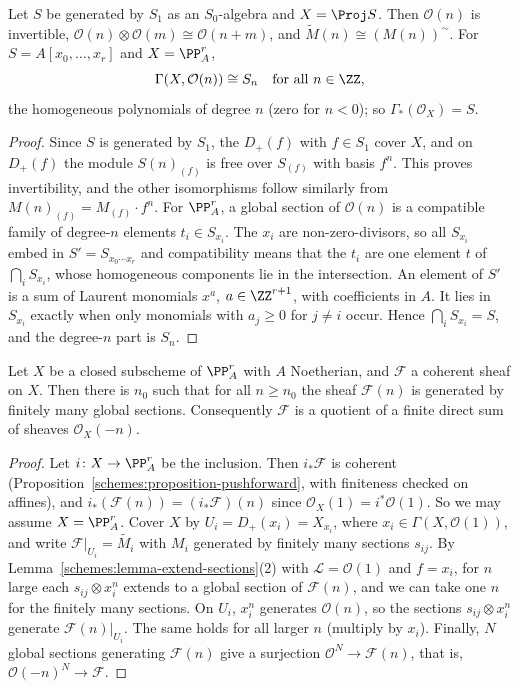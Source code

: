 \begin{proposition}\label{schemes:proposition-twisting}
Let $S$ be generated by $S_1$ as an $S_0$-algebra and $X = \Proj S$. Then $\mathcal{O}(n)$ is invertible, $\mathcal{O}(n) \otimes \mathcal{O}(m) \cong \mathcal{O}(n+m)$, and
$\widetilde M(n) \cong (M(n))^\sim$. For $S = A[x_0, \ldots, x_r]$ and $X = \PP^r_A$,
\[
\Gamma(X, \mathcal{O}(n)) \cong S_n \quad \text{for all } n \in \ZZ,
\]
the homogeneous polynomials of degree $n$ (zero for $n < 0$); so $\Gamma_*(\mathcal{O}_X) = S$.
\end{proposition}

\begin{proof}
Since $S$ is generated by $S_1$, the $D_+(f)$ with $f \in S_1$ cover $X$, and on $D_+(f)$ the module $S(n)_{(f)}$ is free over $S_{(f)}$ with basis $f^n$. This
proves invertibility, and the other isomorphisms follow similarly from $M(n)_{(f)} = M_{(f)} \cdot f^n$. For $\PP^r_A$, a global section of $\mathcal{O}(n)$ is a
compatible family of degree-$n$ elements $t_i \in S_{x_i}$. The $x_i$ are non-zero-divisors, so all $S_{x_i}$ embed in $S' = S_{x_0 \cdots x_r}$ and compatibility
means that the $t_i$ are one element $t$ of $\bigcap_iS_{x_i}$, whose homogeneous components lie in the intersection. An element of $S'$ is a sum of Laurent
monomials $x^a$, $a \in \ZZ^{r+1}$, with coefficients in $A$. It lies in $S_{x_i}$ exactly when only monomials with $a_j \geq 0$ for $j \neq i$ occur. Hence
$\bigcap_iS_{x_i} = S$, and the degree-$n$ part is $S_n$.
\end{proof}

\begin{theorem}[Serre]\label{schemes:theorem-serre-generation}
Let $X$ be a closed subscheme of $\PP^r_A$ with $A$ Noetherian, and $\mathcal{F}$ a coherent sheaf on $X$. Then there is $n_0$ such that for all $n \geq n_0$ the
sheaf $\mathcal{F}(n)$ is generated by finitely many global sections. Consequently $\mathcal{F}$ is a quotient of a finite direct sum of sheaves
$\mathcal{O}_X(-n)$.
\end{theorem}

\begin{proof}
Let $i \colon X \to \PP^r_A$ be the inclusion. Then $i_*\mathcal{F}$ is coherent (Proposition~\ref{schemes:proposition-pushforward}, with
finiteness checked on affines), and $i_*(\mathcal{F}(n)) = (i_*\mathcal{F})(n)$ since $\mathcal{O}_X(1) = i^*\mathcal{O}(1)$. So we may assume $X = \PP^r_A$. Cover
$X$ by $U_i = D_+(x_i) = X_{x_i}$, where $x_i \in \Gamma(X, \mathcal{O}(1))$, and write $\mathcal{F}|_{U_i} = \widetilde{M_i}$ with $M_i$ generated by finitely
many sections $s_{ij}$. By Lemma~\ref{schemes:lemma-extend-sections}(2) with $\mathcal{L} = \mathcal{O}(1)$ and $f = x_i$, for $n$ large each
$s_{ij} \otimes x_i^n$ extends to a global section of $\mathcal{F}(n)$, and we can take one $n$ for the finitely many sections. On $U_i$, $x_i^n$ generates
$\mathcal{O}(n)$, so the sections $s_{ij} \otimes x_i^n$ generate $\mathcal{F}(n)|_{U_i}$. The same holds for all larger $n$ (multiply by $x_i$). Finally, $N$ global
sections generating $\mathcal{F}(n)$ give a surjection $\mathcal{O}^N \to \mathcal{F}(n)$, that is, $\mathcal{O}(-n)^N \to \mathcal{F}$.
\end{proof}

